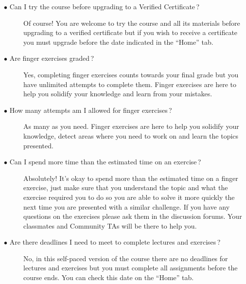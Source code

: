 \documentclass{article}
\newcommand{\question}[1]{\item[$\bullet$ #1] \hfil}
\newenvironment{answer}{}{}
\newenvironment{faq}{\begin{description}}{\end{description}}
\begin{document}
	\begin{faq}
		\question{Can I try the course before upgrading to a Verified Certificate\,?}
		
		\begin{answer}
			Of course! You are welcome to try the course and all its materials before
			upgrading to a verified certificate but if you wish to receive a certificate you
			must upgrade before the date indicated in the ``Home'' tab.
		\end{answer}
		
		\question{Are finger exercises graded\,?}
		
		\begin{answer}
			Yes, completing finger exercises counts towards your final grade but you
			have unlimited attempts to complete them. Finger exercises are here to help
			you solidify your knowledge and learn from your mistakes.
		\end{answer}
		
		\question{How many attempts am I allowed for finger exercises\,?}
		
		\begin{answer}
			As many as you need. Finger exercises are here to help you solidify your
			knowledge, detect areas where you need to work on and learn the topics
			presented.
		\end{answer}
		
		\question{Can I spend more time than the estimated time on an exercise\,?}
		
		\begin{answer}
			Absolutely! It’s okay to spend more than the estimated time on a finger
			exercise, just make sure that you understand the topic and what the exercise
			required you to do so you are able to solve it more quickly the next time you
			are presented with a similar challenge. If you have any questions on the
			exercises please ask them in the discussion forums. Your classmates and
			Community TAs will be there to help you.
		\end{answer}
		
		\question{Are there deadlines I need to meet to complete lectures and exercises\,?}
		
		\begin{answer}
			No, in this self-paced version of the course there are no deadlines for lectures
			and exercises but you must complete all assignments before the course
			ends. You can check this date on the ``Home'' tab.
		\end{answer}
		

\end{faq}
\end{document}
